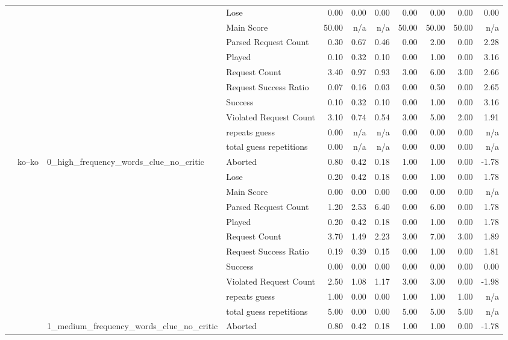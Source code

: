 \begin{tabular}{llllrrrrrrr}
 &  &  & Lose & 0.00 & 0.00 & 0.00 & 0.00 & 0.00 & 0.00 & 0.00 \\
 &  &  & Main Score & 50.00 & n/a & n/a & 50.00 & 50.00 & 50.00 & n/a \\
 &  &  & Parsed Request Count & 0.30 & 0.67 & 0.46 & 0.00 & 2.00 & 0.00 & 2.28 \\
 &  &  & Played & 0.10 & 0.32 & 0.10 & 0.00 & 1.00 & 0.00 & 3.16 \\
 &  &  & Request Count & 3.40 & 0.97 & 0.93 & 3.00 & 6.00 & 3.00 & 2.66 \\
 &  &  & Request Success Ratio & 0.07 & 0.16 & 0.03 & 0.00 & 0.50 & 0.00 & 2.65 \\
 &  &  & Success & 0.10 & 0.32 & 0.10 & 0.00 & 1.00 & 0.00 & 3.16 \\
 &  &  & Violated Request Count & 3.10 & 0.74 & 0.54 & 3.00 & 5.00 & 2.00 & 1.91 \\
 &  &  & repeats guess & 0.00 & n/a & n/a & 0.00 & 0.00 & 0.00 & n/a \\
 &  &  & total guess repetitions & 0.00 & n/a & n/a & 0.00 & 0.00 & 0.00 & n/a \\
\cline{2-11} \cline{3-11}
 & \multirow[t]{33}{*}{ko--ko} & \multirow[t]{11}{*}{0_high_frequency_words_clue_no_critic} & Aborted & 0.80 & 0.42 & 0.18 & 1.00 & 1.00 & 0.00 & -1.78 \\
 &  &  & Lose & 0.20 & 0.42 & 0.18 & 0.00 & 1.00 & 0.00 & 1.78 \\
 &  &  & Main Score & 0.00 & 0.00 & 0.00 & 0.00 & 0.00 & 0.00 & n/a \\
 &  &  & Parsed Request Count & 1.20 & 2.53 & 6.40 & 0.00 & 6.00 & 0.00 & 1.78 \\
 &  &  & Played & 0.20 & 0.42 & 0.18 & 0.00 & 1.00 & 0.00 & 1.78 \\
 &  &  & Request Count & 3.70 & 1.49 & 2.23 & 3.00 & 7.00 & 3.00 & 1.89 \\
 &  &  & Request Success Ratio & 0.19 & 0.39 & 0.15 & 0.00 & 1.00 & 0.00 & 1.81 \\
 &  &  & Success & 0.00 & 0.00 & 0.00 & 0.00 & 0.00 & 0.00 & 0.00 \\
 &  &  & Violated Request Count & 2.50 & 1.08 & 1.17 & 3.00 & 3.00 & 0.00 & -1.98 \\
 &  &  & repeats guess & 1.00 & 0.00 & 0.00 & 1.00 & 1.00 & 1.00 & n/a \\
 &  &  & total guess repetitions & 5.00 & 0.00 & 0.00 & 5.00 & 5.00 & 5.00 & n/a \\
\cline{3-11}
 &  & \multirow[t]{11}{*}{1_medium_frequency_words_clue_no_critic} & Aborted & 0.80 & 0.42 & 0.18 & 1.00 & 1.00 & 0.00 & -1.78 \\

\end{tabular}
